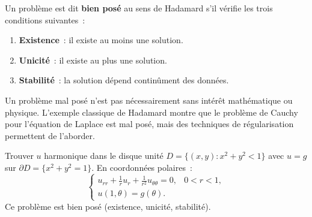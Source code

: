 \begin{center}
\end{center}

\begin{definition}
Un probl\`eme est dit \textbf{bien pos\'e} au sens de Hadamard s'il
v\'erifie les trois conditions suivantes~:
\begin{enumerate}
    \item \textbf{Existence}~: il existe au moins une solution.
    \item \textbf{Unicit\'e}~: il existe au plus une solution.
    \item \textbf{Stabilit\'e}~: la solution d\'epend continûment des donn\'ees.
\end{enumerate}
\end{definition}

\begin{attention}[title=\textbf{Importance du caract\`ere bien pos\'e}]
Un probl\`eme mal pos\'e n'est pas n\'ecessairement sans int\'er\^et
math\'ematique ou physique. L'exemple classique de Hadamard montre que le
probl\`eme de Cauchy pour l'\'equation de Laplace est mal pos\'e, mais des
techniques de r\'egularisation permettent de l'aborder.
\end{attention}

\begin{exemple}
Trouver $u$ harmonique dans le disque unit\'e $D = \{(x,y) : x^2+y^2 < 1\}$
avec $u = g$ sur $\partial D = \{x^2+y^2=1\}$. En coordonn\'ees polaires~:
\[
    \begin{cases}
        u_{rr} + \frac{1}{r}u_r + \frac{1}{r^2}u_{\theta\theta} = 0,
        & 0 < r < 1,\\
        u(1,\theta) = g(\theta).
    \end{cases}
\]
Ce probl\`eme est bien pos\'e (existence, unicit\'e, stabilit\'e).
\end{exemple}

